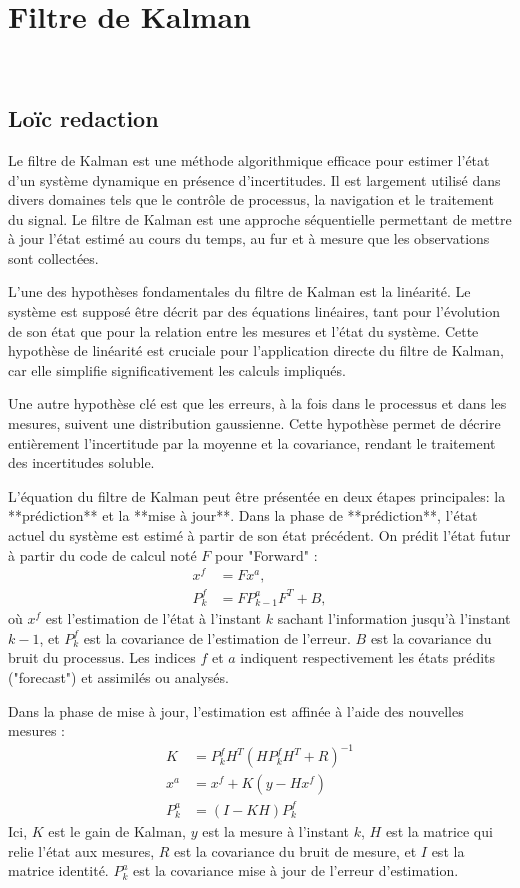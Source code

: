 \section{Filtre de Kalman}~\label{kalman_filter}

\subsection{Loïc redaction}

Le filtre de Kalman est une méthode algorithmique efficace pour estimer l'état d'un système dynamique en présence d'incertitudes. Il est largement utilisé dans divers domaines tels que le contrôle de processus, la navigation et le traitement du signal. Le filtre de Kalman est une approche séquentielle permettant de mettre à jour l'état estimé au cours du temps, au fur et à mesure que les observations sont collectées.

L'une des hypothèses fondamentales du filtre de Kalman est la linéarité. Le système est supposé être décrit par des équations linéaires, tant pour l'évolution de son état que pour la relation entre les mesures et l'état du système. Cette hypothèse de linéarité est cruciale pour l'application directe du filtre de Kalman, car elle simplifie significativement les calculs impliqués.

Une autre hypothèse clé est que les erreurs, à la fois dans le processus et dans les mesures, suivent une distribution gaussienne. Cette hypothèse permet de décrire entièrement l'incertitude par la moyenne et la covariance, rendant le traitement des incertitudes soluble.

L'équation du filtre de Kalman peut être présentée en deux étapes principales: la **prédiction** et la **mise à jour**. Dans la phase de **prédiction**, l'état actuel du système est estimé à partir de son état précédent. On prédit l'état futur à partir du code de calcul noté $F$ pour "Forward" :
$$
    \begin{aligned}
        x^{f} & = F x^{a},             \\
        P_k^f & = F P_{k-1}^a F^T + B,
    \end{aligned}
$$
où $x^f$ est l'estimation de l'état à l'instant $k$ sachant l'information jusqu'à l'instant $k-1$, et $P_k^f$ est la covariance de l'estimation de l'erreur. $B$ est la covariance du bruit du processus. Les indices $f$ et $a$ indiquent respectivement les états prédits ("forecast") et assimilés ou analysés.

Dans la phase de mise à jour, l'estimation est affinée à l'aide des nouvelles mesures :
$$
    \begin{aligned}
        K     & = P_k^f H^T (H P_k^f H^T + R)^{-1} \\
        x^a   & = x^f + K (y - H x^f)              \\
        P_k^a & = (I - K H) P_k^f
    \end{aligned}
$$
Ici, $K$ est le gain de Kalman, $y$ est la mesure à l'instant $k$, $H$ est la matrice qui relie l'état aux mesures, $R$ est la covariance du bruit de mesure, et $I$ est la matrice identité. $P_k^a$ est la covariance mise à jour de l'erreur d'estimation.

